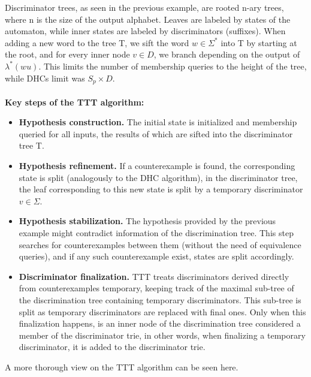 Discriminator trees, as seen in the previous example, are rooted n-ary trees, where n is the size of the output alphabet. Leaves are labeled by states of the automaton, while inner states are labeled by discriminators (suffixes). When adding a new word to the tree T, we sift the word $w\in\Sigma^*$ into T by starting at the root, and for every inner node $v\in D$, we branch depending on the output of $\lambda^*(wu)$. This limits the number of membership queries to the height of the tree, while DHCs limit was $S_p\times D$.
\\\\
\textbf{Key steps of the TTT algorithm:}
\begin{itemize}
	\item \textbf{Hypothesis construction.} The initial state is initialized and membership queried for all inputs, the results of which are sifted into the discriminator tree T.
	\item \textbf{Hypothesis refinement.} If a counterexample is found, the corresponding state is split (analogously to the DHC algorithm), in the discriminator tree, the leaf corresponding to this new state is split by a temporary discriminator $v\in\Sigma$.
	\item \textbf{Hypothesis stabilization.} The hypothesis provided by the previous example might contradict information of the discrimination tree. This step searches for counterexamples between them (without the need of equivalence queries), and if any such counterexample exist, states are split accordingly.
	\item \textbf{Discriminator finalization.} TTT treats discriminators derived directly from counterexamples temporary, keeping track of the maximal sub-tree of the discrimination tree containing temporary discriminators. This sub-tree is split as temporary discriminators are replaced with final ones. Only when this finalization happens, is an inner node of the discrimination tree considered a member of the discriminator trie, in other words, when finalizing a temporary discriminator, it is added to the discriminator trie.
\end{itemize}
A more thorough view on the TTT algorithm can be seen here\cite{10.1007/978-3-319-11164-3_26}.
